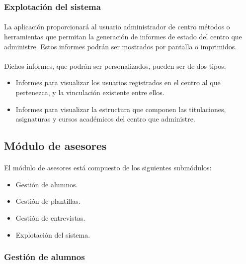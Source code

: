       \subsubsection{Explotación del sistema}

      \paragraph{}La aplicación proporcionará al usuario administrador de centro
      métodos o herramientas que permitan la generación de informes de estado
      del centro que administre. Estos informes podrán ser mostrados por
      pantalla o imprimidos.

      \paragraph{}Dichos informes, que podrán ser personalizados, pueden ser
      de dos tipos:

      \begin{itemize}
       \item Informes para visualizar los usuarios registrados en el centro
             al que pertenezca, y la vinculación existente entre ellos.
       \item Informes para visualizar la estructura que componen las
             titulaciones, asignaturas y cursos académicos del centro que
             administre.
      \end{itemize}

   \subsection{Módulo de asesores}

      \paragraph{}El módulo de asesores está compuesto de los siguientes
      submódulos:

      \begin{itemize}
       \item Gestión de alumnos.
       \item Gestión de plantillas.
       \item Gestión de entrevistas.
       \item Explotación del sistema.
      \end{itemize}

      \subsubsection{Gestión de alumnos}

